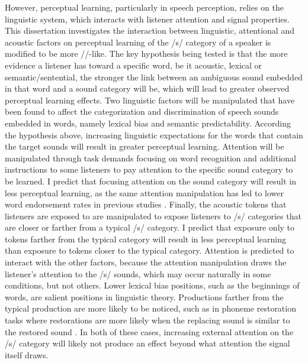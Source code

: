 However, perceptual learning, particularly in speech perception, relies on the linguistic system, which interacts with listener attention and signal properties.
This dissertation investigates the interaction between linguistic, attentional and acoustic factors on perceptual learning of the /s/ category of a speaker is modified to be more /\textesh/-like.
The key hypothesis being tested is that the more evidence a listener has toward a specific word, be it acoustic, lexical or semantic/sentential, the stronger the link between an ambiguous sound embedded in that word and a sound category will be, which will lead to greater observed perceptual learning effects.
Two linguistic factors will be manipulated that have been found to affect the categorization and discrimination of speech sounds embedded in words, namely lexical bias and semantic predictability.
According the hypothesis above, increasing linguistic expectations for the words that contain the target sounds will result in greater perceptual learning.
Attention will be manipulated through task demands focusing on word recognition and additional instructions to some listeners to pay attention to the specific sound category to be learned.
I predict that focusing attention on the sound category will result in less perceptual learning, as the same attention manipulation has led to lower word endorsement rates in previous studies \citep{Pitt2012}.
Finally, the acoustic tokens that listeners are exposed to are manipulated to expose listeners to /s/ categories that are closer or farther from a typical /s/ category.
I predict that exposure only to tokens farther from the typical category will result in less perceptual learning than exposure to tokens closer to the typical category.
Attention is predicted to interact with the other factors, because the attention manipulation draws the listener's attention to the /s/ sounds, which may occur naturally in some conditions, but not others.
Lower lexical bias positions, such as the beginnings of words, are salient positions in linguistic theory. 
Productions farther from the typical production are more likely to be noticed, such as in phoneme restoration tasks where restorations are more likely when the replacing sound is similar to the restored sound \citep{Samuel1981}.
In both of these cases, increasing external attention on the /s/ category will likely not produce an effect beyond what attention the signal itself draws.


